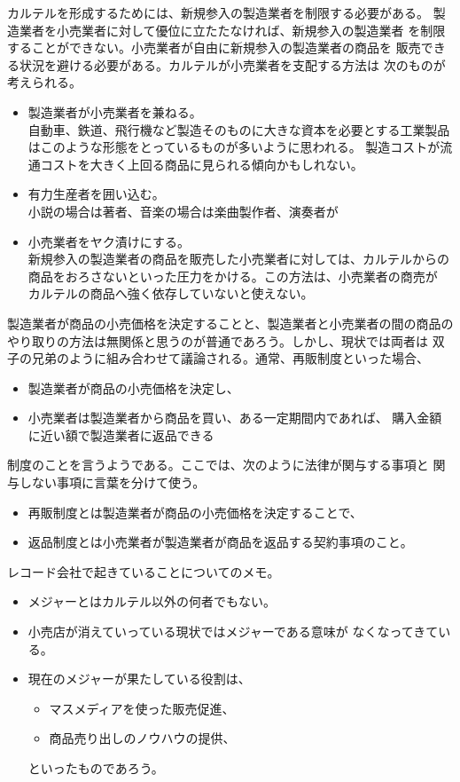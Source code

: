 	カルテルを形成するためには、新規参入の製造業者を制限する必要がある。
	製造業者を小売業者に対して優位に立たたなければ、新規参入の製造業者
	を制限することができない。小売業者が自由に新規参入の製造業者の商品を
	販売できる状況を避ける必要がある。カルテルが小売業者を支配する方法は
	次のものが考えられる。
	\begin{itemize}\setlength{\itemsep}{-1mm} %
		\item 製造業者が小売業者を兼ねる。\\
		自動車、鉄道、飛行機など製造そのものに大きな資本を必要とする工業製品
		はこのような形態をとっているものが多いように思われる。
		製造コストが流通コストを大きく上回る商品に見られる傾向かもしれない。
		\item 有力生産者を囲い込む。\\
		小説の場合は著者、音楽の場合は楽曲製作者、演奏者が
		\item 小売業者をヤク漬けにする。\\
		新規参入の製造業者の商品を販売した小売業者に対しては、カルテルからの
		商品をおろさないといった圧力をかける。この方法は、小売業者の商売が
		カルテルの商品へ強く依存していないと使えない。
	\end{itemize} %

	製造業者が商品の小売価格を決定することと、製造業者と小売業者の間の商品の
	やり取りの方法は無関係と思うのが普通であろう。しかし、現状では両者は
	双子の兄弟のように組み合わせて議論される。通常、再販制度といった場合、
	\begin{itemize}\setlength{\itemsep}{-1mm} %
		\item 製造業者が商品の小売価格を決定し、
		\item 小売業者は製造業者から商品を買い、ある一定期間内であれば、
		購入金額に近い額で製造業者に返品できる
	\end{itemize} %
	制度のことを言うようである。ここでは、次のように法律が関与する事項と
	関与しない事項に言葉を分けて使う。
	\begin{itemize}\setlength{\itemsep}{-1mm} %
		\item 再販制度とは製造業者が商品の小売価格を決定することで、
		\item 返品制度とは小売業者が製造業者が商品を返品する契約事項のこと。
	\end{itemize} %

	レコード会社で起きていることについてのメモ。
	\begin{itemize}\setlength{\itemsep}{-1mm} %
		\item メジャーとはカルテル以外の何者でもない。
		\item 小売店が消えていっている現状ではメジャーである意味が
		なくなってきている。
		\item 現在のメジャーが果たしている役割は、
		\begin{itemize}\setlength{\itemsep}{-1mm} %
			\item マスメディアを使った販売促進、
			\item 商品売り出しのノウハウの提供、
		\end{itemize} %
		といったものであろう。
	\end{itemize} %

